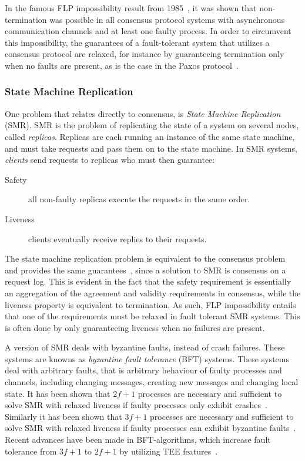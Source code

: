 \documentclass{article}
\begin{document}
		In the famous FLP impossibility result from 1985~\cite{fischer_impossibility_1985}, it was shown that non-termination was possible in all consensus protocol systems with asynchronous communication channels and at least one faulty process.
		In order to circumvent this impossibility, the guarantees of a fault-tolerant system that utilizes a consensus protocol are relaxed, for instance by guaranteeing termination only when no faults are present, as is the case in the Paxos protocol~\cite{lamport_part-time_1998}.

		\subsubsection{State Machine Replication}

		One problem that relates directly to consensus, is \textit{State Machine Replication}~\cite{schneider_implementing_1990} (SMR).
		SMR is the problem of replicating the state of a system on several nodes, called \textit{replicas}.
		Replicas are each running an instance of the same state machine, and must take requests and pass them on to the state machine.
		In SMR systems, \textit{clients} send requests to replicas who must then guarantee:
		\begin{description}
			\item[Safety] all non-faulty replicas execute the requests in the same order.
			\item[Liveness] clients eventually receive replies to their requests.
		\end{description}
		The state machine replication problem is equivalent to the consensus problem and provides the same guarantees~\cite{schneider_implementing_1990}, since a solution to SMR is consensus on a request log.
		This is evident in the fact that the safety requirement is essentially an aggregation of the agreement and validity requirements in consensus, while the liveness property is equivalent to termination.
		As such, FLP impossibility entails that one of the requirements must be relaxed in fault tolerant SMR systems.
		This is often done by only guaranteeing liveness when no failures are present.

		A version of SMR deals with byzantine faults, instead of crash failures.
		These systems are knowns as \textit{byzantine fault tolerance} (BFT) systems.
		These systems deal with arbitrary faults, that is arbitrary behaviour of faulty processes and channels, including changing messages, creating new messages and changing local state.
		It has been shown that $2f+1$ processes are necessary and sufficient to solve SMR with relaxed liveness if faulty processes only exhibit crashes~\cite{bracha_asynchronous_1985}.
		Similarly it has been shown that $3f+1$ processes are necessary and sufficient to solve SMR with relaxed liveness if faulty processes can exhibit byzantine faults~\cite{bracha_asynchronous_1985,pease_reaching_1980}.
		Recent advances have been made in BFT-algorithms, which increase fault tolerance from $3f+1$ to $2f+1$ by utilizing TEE features~\cite{liu_scalable_2016,kapitza_cheapbft_2012,veronese_efficient_2013}.
\end{document}

